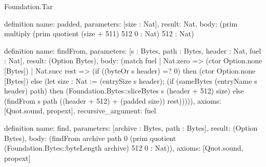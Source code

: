 \begin{lexlean}{Foundation.Tar}
\begin{semanticmodule}
definition{
  name: padded,
  parameters: [size : Nat],
  result: Nat,
  body: (prim multiply (prim quotient (size + 511) 512 0 : Nat) 512 : Nat)
}

definition{
  name: findFrom,
  parameters: [s : Bytes, path : Bytes, header : Nat, fuel : Nat],
  result: (Option Bytes),
  body: (match fuel
    | Nat.zero => (ctor Option.none [Bytes])
    | Nat.succ rest => (if ((byteOr s header) =? 0) then (ctor Option.none [Bytes]) else (let size : Nat := (entrySize s header); (if (sameBytes (entryName s header) path) then (Foundation.Bytes::sliceBytes s (header + 512) size) else (findFrom s path ((header + 512) + (padded size)) rest))))),
  axioms: [Quot.sound, propext],
  recursive_argument: fuel
}

definition{
  name: find,
  parameters: [archive : Bytes, path : Bytes],
  result: (Option Bytes),
  body: (findFrom archive path 0 (prim quotient (Foundation.Bytes::byteLength archive) 512 0 : Nat)),
  axioms: [Quot.sound, propext]
}
\end{semanticmodule}
\end{lexlean}
